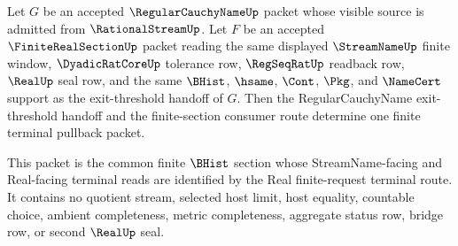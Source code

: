 \begin{theorem}
\label{thm:regularcauchyname-finite-section-terminal-pullback-coherence}
Let $G$ be an accepted $\RegularCauchyNameUp$ packet whose visible source is admitted from $\RationalStreamUp$. Let $F$ be an accepted $\FiniteRealSectionUp$ packet reading the same displayed $\StreamNameUp$ finite window, $\DyadicRatCoreUp$ tolerance row, $\RegSeqRatUp$ readback row, $\RealUp$ seal row, and the same $\BHist$, $\hsame$, $\Cont$, $\Pkg$, and $\NameCert$ support as the exit-threshold handoff of $G$. Then the RegularCauchyName exit-threshold handoff and the finite-section consumer route determine one finite terminal pullback packet.

This packet is the common finite $\BHist$ section whose StreamName-facing and Real-facing terminal reads are identified by the Real finite-request terminal route. It contains no quotient stream, selected host limit, host equality, countable choice, ambient completeness, metric completeness, aggregate status row, bridge row, or second $\RealUp$ seal.
\end{theorem}
